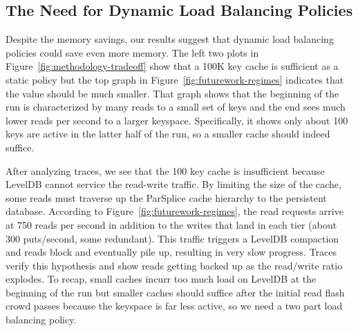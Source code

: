 \subsection{The Need for Dynamic Load Balancing Policies}

Despite the memory savings, our results suggest that dynamic load balancing
policies could save even more memory.  The left two plots in
Figure~\ref{fig:methodology-tradeoff} show that a 100K key cache is sufficient
as a static policy but the top graph in Figure~\ref{fig:futurework-regimes}
indicates that the value should be much smaller. That graph shows that the
beginning of the run is characterized by many reads to a small set of keys and
the end sees much lower reads per second to a larger keyspace. Specifically, it
shows only about 100 keys are active in the latter half of the run, so a
smaller cache should indeed suffice. 

After analyzing traces, we see that the 100 key cache is insufficient because
LevelDB cannot service the read-write traffic. By limiting the size of the
cache, some reads must traverse up the ParSplice cache hierarchy to the
persistent database.  According to Figure~\ref{fig:futurework-regimes}, the
read requests arrive at 750 reads per second in addition to the writes that
land in each tier (about 300 puts/second, some redundant). This traffic
triggers a LevelDB compaction and reads block and eventually pile up, resulting
in very slow progress. Traces verify this hypothesis and show reads getting
backed up as the read/write ratio explodes. To recap, small caches incurr too
much load on LevelDB at the beginning of the run but smaller caches should
suffice after the initial read flash crowd passes because the keyspace is far
less active, so we need a two part load balancing policy.



